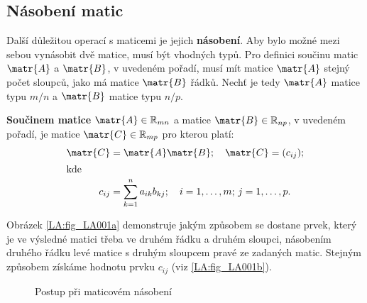       

    \subsection{Násobení matic}\label{mai:IchapIIsecIIIsubIII}
      Další důležitou operací s maticemi je jejich \textbf{násobení}. Aby bylo možné mezi sebou 
      vynásobit dvě matice, musí být vhodných typů. Pro definici součinu matic \(\matr{A}\) a 
      \(\matr{B}\), v uvedeném pořadí, musí mít matice \(\matr{A}\) stejný počet sloupců, jako má 
      matice \(\matr{B}\) řádků. Nechť je tedy \(\matr{A}\) matice typu \(m/n\) a \(\matr{B}\) 
      matice typu \(n/p\).
      
      \begin{mdframed}[style=highlight]
        \begin{definition} 
          \textbf{Součinem matice} \(\matr{A} \in \mathbb{R}_{mn}\) a matice \(\matr{B} \in
          \mathbb{R}_{np}\), v uvedeném pořadí, je matice \(\matr{C} \in \mathbb{R}_{mp}\) pro
          kterou platí:
          \begin{align*}
            \matr{C} &= \matr{A}\matr{B}; \quad \matr{C} = (c_{ij}); \\
                 \shortintertext{kde}
            c_{ij} &= \sum^n_{k=1}{a_{ik}b_{kj}};\quad
                       i = 1,\ldots,m; \, j = 1,\ldots,p.
          \end{align*} 
        \end{definition}
      \end{mdframed}
      Obrázek \ref{LA:fig_LA001a} demonstruje jakým způsobem se dostane prvek, který je ve výsledné 
      matici třeba ve druhém řádku a druhém sloupci, násobením druhého řádku levé matice s druhým 
      sloupcem pravé ze zadaných matic. Stejným způsobem získáme hodnotu prvku \(c_{ij}\) (viz 
      \ref{LA:fig_LA001b}).
      \begin{figure}[ht!]
        \centering  
         \newline
        \caption{Postup při maticovém násobení}
      \end{figure}

